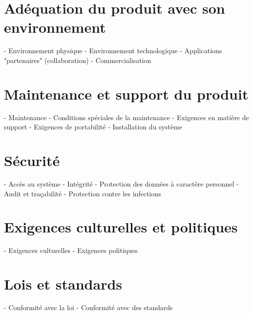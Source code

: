 \section{Adéquation du produit avec son environnement}
- Environnement physique
- Environnement technologique
- Applications "partenaires" (collaboration)
- Commercialisation

\section{Maintenance et support du produit}
- Maintenance
- Conditions spéciales de la maintenance
- Exigences en matière de support
- Exigences de portabilité
- Installation du système

\section{Sécurité}
- Accès au système
- Intégrité
- Protection des données à caractère personnel
- Audit et traçabilité
- Protection contre les infections

\section{Exigences culturelles et politiques}
- Exigences culturelles
- Exigences politiques

\section{Lois et standards}
- Conformité avec la loi
- Conformité avec des standards